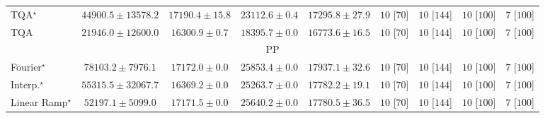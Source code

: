 \begin{tabular}{l|cccc|cccc|}
TQA$^\star$ & {\cellcolor[HTML]{F6861F}} \color[HTML]{F1F1F1} $44900.5\pm 13578.2$ & {\cellcolor[HTML]{FEE89D}} \color[HTML]{000000} $17190.4\pm 15.8$ & {\cellcolor[HTML]{FEDA7E}} \color[HTML]{000000} $23112.6\pm 0.4$ & {\cellcolor[HTML]{FEE89D}} \color[HTML]{000000} $17295.8\pm 27.9$ & {\cellcolor[HTML]{49006A}} \color[HTML]{F1F1F1} $10$ [$70$] & {\cellcolor[HTML]{49006A}} \color[HTML]{F1F1F1} $10$ [$144$] & {\cellcolor[HTML]{49006A}} \color[HTML]{F1F1F1} $10$ [$100$] & {\cellcolor[HTML]{FFF7F3}} \color[HTML]{000000} $7$ [$100$] \\
TQA & {\cellcolor[HTML]{FEDD84}} \color[HTML]{000000} $21946.0\pm 12600.0$ & {\cellcolor[HTML]{FEEAA1}} \color[HTML]{000000} $16300.9\pm 0.7$ & {\cellcolor[HTML]{FEE697}} \color[HTML]{000000} $18395.7\pm 0.0$ & {\cellcolor[HTML]{FEE99E}} \color[HTML]{000000} $16773.6\pm 16.5$ & {\cellcolor[HTML]{49006A}} \color[HTML]{F1F1F1} $10$ [$70$] & {\cellcolor[HTML]{49006A}} \color[HTML]{F1F1F1} $10$ [$144$] & {\cellcolor[HTML]{49006A}} \color[HTML]{F1F1F1} $10$ [$100$] & {\cellcolor[HTML]{FFF7F3}} \color[HTML]{000000} $7$ [$100$] \\
\cline{1-9}
\multicolumn{9}{c}{\rule{0pt}{8pt}PP} \\
\midrule
Fourier$^\star$ & {\cellcolor[HTML]{00502D}} \color[HTML]{F1F1F1} $78103.2\pm 7976.1$ & {\cellcolor[HTML]{E1F3A9}} \color[HTML]{000000} $17172.0\pm 0.0$ & {\cellcolor[HTML]{C0E597}} \color[HTML]{000000} $25853.4\pm 0.0$ & {\cellcolor[HTML]{DFF3A8}} \color[HTML]{000000} $17937.1\pm 32.6$ & {\cellcolor[HTML]{49006A}} \color[HTML]{F1F1F1} $10$ [$70$] & {\cellcolor[HTML]{49006A}} \color[HTML]{F1F1F1} $10$ [$144$] & {\cellcolor[HTML]{49006A}} \color[HTML]{F1F1F1} $10$ [$100$] & {\cellcolor[HTML]{FFF7F3}} \color[HTML]{000000} $7$ [$100$] \\
Interp.$^\star$ & {\cellcolor[HTML]{339951}} \color[HTML]{F1F1F1} $55315.5\pm 32067.7$ & {\cellcolor[HTML]{E4F4AB}} \color[HTML]{000000} $16369.2\pm 0.0$ & {\cellcolor[HTML]{C3E698}} \color[HTML]{000000} $25263.7\pm 0.0$ & {\cellcolor[HTML]{DFF3A8}} \color[HTML]{000000} $17782.2\pm 19.1$ & {\cellcolor[HTML]{49006A}} \color[HTML]{F1F1F1} $10$ [$70$] & {\cellcolor[HTML]{49006A}} \color[HTML]{F1F1F1} $10$ [$144$] & {\cellcolor[HTML]{49006A}} \color[HTML]{F1F1F1} $10$ [$100$] & {\cellcolor[HTML]{FFF7F3}} \color[HTML]{000000} $7$ [$100$] \\
Linear Ramp$^\star$ & {\cellcolor[HTML]{3DA559}} \color[HTML]{F1F1F1} $52197.1\pm 5099.0$ & {\cellcolor[HTML]{E1F3A9}} \color[HTML]{000000} $17171.5\pm 0.0$ & {\cellcolor[HTML]{C1E698}} \color[HTML]{000000} $25640.2\pm 0.0$ & {\cellcolor[HTML]{DFF3A8}} \color[HTML]{000000} $17780.5\pm 36.5$ & {\cellcolor[HTML]{49006A}} \color[HTML]{F1F1F1} $10$ [$70$] & {\cellcolor[HTML]{49006A}} \color[HTML]{F1F1F1} $10$ [$144$] & {\cellcolor[HTML]{49006A}} \color[HTML]{F1F1F1} $10$ [$100$] & {\cellcolor[HTML]{FFF7F3}} \color[HTML]{000000} $7$ [$100$] \\

\end{tabular}
